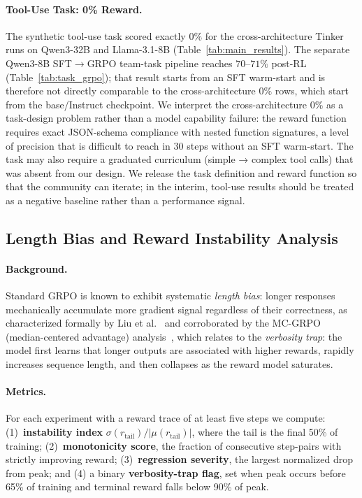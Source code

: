 \documentclass{article}
\begin{document}
\paragraph{Tool-Use Task: 0\% Reward.}
The synthetic tool-use task scored exactly $0\%$ for the
cross-architecture Tinker runs on Qwen3-32B and Llama-3.1-8B
(Table~\ref{tab:main_results}). The separate Qwen3-8B SFT$\to$GRPO
team-task pipeline reaches $70$--$71\%$ post-RL
(Table~\ref{tab:task_grpo}); that result starts from an SFT warm-start
and is therefore not directly comparable to the cross-architecture
$0\%$ rows, which start from the base/Instruct checkpoint. We
interpret the cross-architecture $0\%$ as a task-design problem
rather than a model capability failure: the reward function requires
exact JSON-schema compliance with nested function signatures, a
level of precision that is difficult to reach in 30 steps without
an SFT warm-start.
The task may also require a graduated curriculum (simple → complex tool calls)
that was absent from our design. We release the task definition and reward
function so that the community can iterate; in the interim, tool-use results
should be treated as a negative baseline rather than a performance signal.

\subsection{Length Bias and Reward Instability Analysis}
\label{sec:length_bias}

\paragraph{Background.}
Standard GRPO is known to exhibit systematic \emph{length bias}: longer responses
mechanically accumulate more gradient signal regardless of their correctness,
as characterized formally by Liu et al.~\cite{tong2025drgrpo} and corroborated
by the MC-GRPO (median-centered advantage) analysis~\cite{mcgrpo2025}, which
relates to the \emph{verbosity trap}: the model first learns that longer outputs are associated
with higher rewards, rapidly increases sequence length, and then collapses as
the reward model saturates.

\paragraph{Metrics.}
For each experiment with a reward trace of at least five steps we compute:
(1)~\textbf{instability index} $\sigma(r_{\text{tail}}) / |\mu(r_{\text{tail}})|$,
where the tail is the final 50\% of training;
(2)~\textbf{monotonicity score}, the fraction of consecutive step-pairs with
strictly improving reward;
(3)~\textbf{regression severity}, the largest normalized drop from peak;
and (4) a binary \textbf{verbosity-trap flag}, set when peak occurs before 65\%
of training and terminal reward falls below 90\% of peak.
\end{document}
